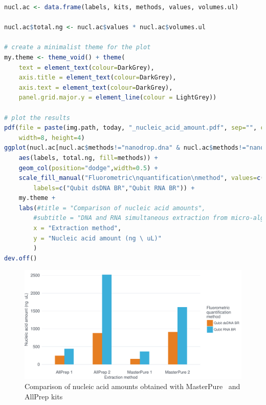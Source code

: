 \begin{lstlisting}[language=r, caption=Comparison of nucleic acid amounts measured by fluorometric-based assay, label=lst:20180220_comparison_qnt]
nucl.ac <- data.frame(labels, kits, methods, values, volumes.ul)

nucl.ac$total.ng <- nucl.ac$values * nucl.ac$volumes.ul

# create a minimalist theme for the plot
my.theme <- theme_void() + theme(
	text = element_text(colour=DarkGrey),
	axis.title = element_text(colour=DarkGrey),
	axis.text = element_text(colour=DarkGrey),
	panel.grid.major.y = element_line(colour = LightGrey))

# plot the results
pdf(file = paste(img.path, today, "_nucleic_acid_amount.pdf", sep="", collapse=NULL), 
	width=8, height=4)
ggplot(nucl.ac[nucl.ac$methods!="nanodrop.dna" & nucl.ac$methods!="nanodrop.rna",], 
	aes(labels, total.ng, fill=methods)) +
	geom_col(position="dodge",width=0.5) +
	scale_fill_manual("Fluorometric\nquantification\nmethod", values=c(Carrot,Aqua), 
		labels=c("Qubit dsDNA BR","Qubit RNA BR")) +
	my.theme +
	labs(#title = "Comparison of nucleic acid amounts", 
		#subtitle = "DNA and RNA simultaneous extraction from micro-algae cultures with MasterPure or AllPrep kits",
		x = "Extraction method",
		y = "Nucleic acid amount (ng \ uL)"
		)
dev.off()
\end{lstlisting}

% 


\begin{figure}[H] %
    \centering
    \caption{Comparison of nucleic acid amounts obtained with MasterPure\texttrademark~ and AllPrep kits}
    \label{fig:20180220_nucleic_acid_amount}
    \includegraphics[width=\textwidth]{graphics/plots/20180220_nucleic_acid_amount.pdf}
\end{figure}
